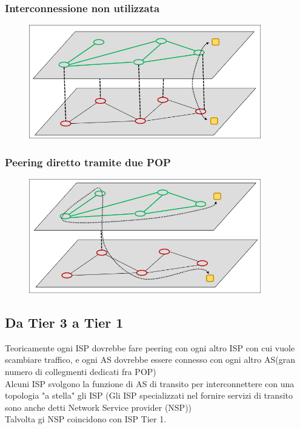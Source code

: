 \documentclass{report}
\begin{document}
                    \subsubsection{Interconnessione non utilizzata}
                        \begin{figure}[H]
                            \includegraphics[width=0.9\textwidth]{3/notUs.png}
                        \end{figure}
                    \subsubsection{Peering diretto tramite due POP} 
                        \begin{figure}[H]
                            \includegraphics[width=0.9\textwidth]{3/peer.png}
                        \end{figure}
                \subsection{Da Tier 3 a Tier 1}
                    Teoricamente ogni ISP dovrebbe fare peering con ogni altro ISP con cui vuole scambiare traffico, e ogni AS dovrebbe essere connesso con ogni altro AS(gran numero di collegmenti dedicati fra POP)
                    \\
                    Alcuni ISP svolgono la funzione di AS di transito per interconnettere con una topologia "a stella" gli ISP (Gli ISP specializzati nel fornire servizi di transito sono anche detti Network Service provider (NSP))
                    \\
                    Talvolta gi NSP coincidono con ISP Tier 1.
\end{document}
